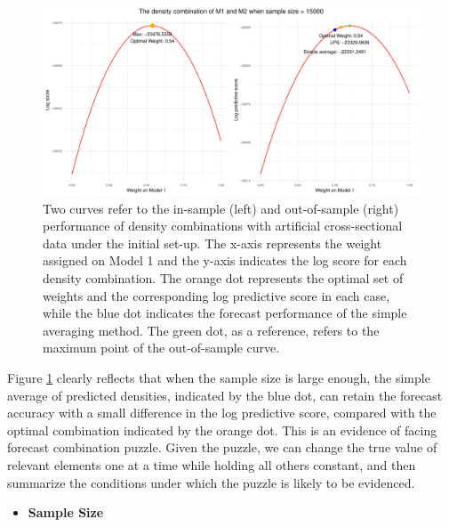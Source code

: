 \documentclass{monashthesis}
\begin{document}
\begin{figure}[ht]
\centering
\includegraphics[scale=0.6]{figures/Sample_Size_15000.pdf}
\caption{Two curves refer to the in-sample (left) and out-of-sample (right) performance of density combinations with artificial cross-sectional data under the initial set-up. The x-axis represents the weight assigned on Model 1 and the y-axis indicates the log score for each density combination. The orange dot represents the optimal set of weights and the corresponding log predictive score in each case, while the blue dot indicates the forecast performance of the simple averaging method. The green dot, as a reference, refers to the maximum point of the out-of-sample curve.}
\label{fig:ss15000}
\end{figure}

Figure \ref{fig:ss15000} clearly reflects that when the sample size is large enough, the simple average of predicted densities, indicated by the blue dot, can retain the forecast accuracy with a small difference in the log predictive score, compared with the optimal combination indicated by the orange dot. This is an evidence of facing forecast combination puzzle. Given the puzzle, we can change the true value of relevant elements one at a time while holding all others constant, and then summarize the conditions under which the puzzle is likely to be evidenced.

\begin{itemize}
\tightlist
\item
  \bf{Sample Size}
\end{itemize}
\end{document}
